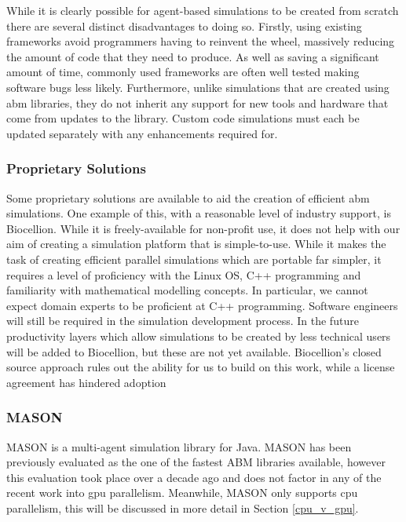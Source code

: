 \documentclass{UoYCSproject}
\begin{document}
While it is clearly possible for agent-based simulations to be created from scratch there are several distinct disadvantages to doing so.
Firstly, using existing frameworks avoid programmers having to reinvent the wheel, massively reducing the amount of code that they need to produce.
As well as saving a significant amount of time, commonly used frameworks are often well tested making software bugs less likely.
Furthermore, unlike simulations that are created using \gls{abm} libraries, they do not inherit any support for new tools and hardware that come from updates to the library.
Custom code simulations must each be updated separately with any enhancements required for.

\subsubsection{Proprietary Solutions}
Some proprietary solutions are available to aid the creation of efficient \gls{abm} simulations.
One example of this, with a reasonable level of industry support, is Biocellion\cite{biocellion_paper}.
While it is freely-available for non-profit use, it does not help with our aim of creating a simulation platform that is simple-to-use.
While it makes the task of creating efficient parallel simulations which are portable far simpler, it requires a level of proficiency with the Linux OS, C++ programming and familiarity with mathematical modelling concepts.
In particular, we cannot expect domain experts to be proficient at C++ programming.
Software engineers will still be required in the simulation development process.
In the future productivity layers which allow simulations to be created by less technical users will be added to Biocellion, but these are not yet available.\cite{biocellion_paper}
Biocellion's closed source approach rules out the ability for us to build on this work, while a license agreement has hindered adoption\cite{physicell}


\subsubsection{\gls{MASON}}
\gls{MASON} is a multi-agent simulation library for Java.
\gls{MASON} has been previously evaluated as the one of the fastest ABM libraries available\cite{abm_platforms_review}, however this evaluation took place over a decade ago and does not factor in any of the recent work into \acrshort{gpu} parallelism\cite{flame_simulation, biocellion_paper, physicell}.
Meanwhile, \gls{MASON} only supports \gls{cpu} parallelism, this will be discussed in more detail in Section \ref{cpu_v_gpu}.
\end{document}
